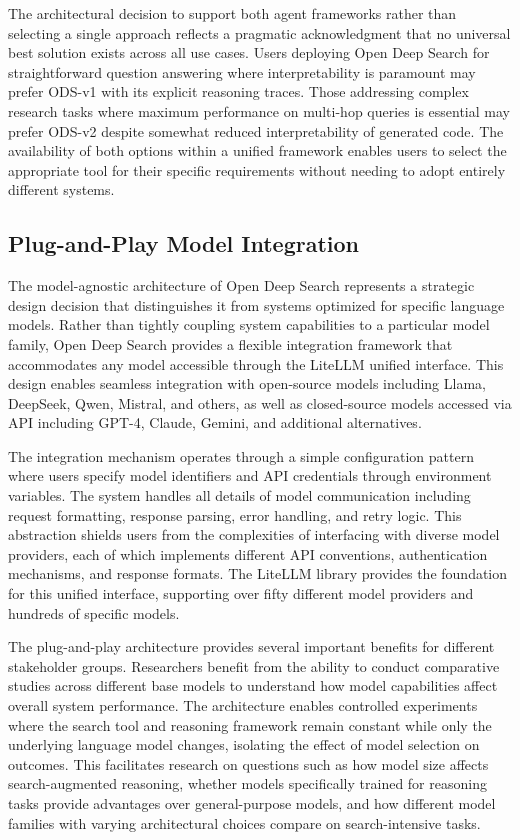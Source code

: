 The architectural decision to support both agent frameworks rather than selecting a single approach reflects a pragmatic acknowledgment that no universal best solution exists across all use cases. Users deploying Open Deep Search for straightforward question answering where interpretability is paramount may prefer ODS-v1 with its explicit reasoning traces. Those addressing complex research tasks where maximum performance on multi-hop queries is essential may prefer ODS-v2 despite somewhat reduced interpretability of generated code. The availability of both options within a unified framework enables users to select the appropriate tool for their specific requirements without needing to adopt entirely different systems.

\subsection{Plug-and-Play Model Integration}

The model-agnostic architecture of Open Deep Search represents a strategic design decision that distinguishes it from systems optimized for specific language models. Rather than tightly coupling system capabilities to a particular model family, Open Deep Search provides a flexible integration framework that accommodates any model accessible through the LiteLLM unified interface. This design enables seamless integration with open-source models including Llama, DeepSeek, Qwen, Mistral, and others, as well as closed-source models accessed via API including GPT-4, Claude, Gemini, and additional alternatives.

The integration mechanism operates through a simple configuration pattern where users specify model identifiers and API credentials through environment variables. The system handles all details of model communication including request formatting, response parsing, error handling, and retry logic. This abstraction shields users from the complexities of interfacing with diverse model providers, each of which implements different API conventions, authentication mechanisms, and response formats. The LiteLLM library provides the foundation for this unified interface, supporting over fifty different model providers and hundreds of specific models.

The plug-and-play architecture provides several important benefits for different stakeholder groups. Researchers benefit from the ability to conduct comparative studies across different base models to understand how model capabilities affect overall system performance. The architecture enables controlled experiments where the search tool and reasoning framework remain constant while only the underlying language model changes, isolating the effect of model selection on outcomes. This facilitates research on questions such as how model size affects search-augmented reasoning, whether models specifically trained for reasoning tasks provide advantages over general-purpose models, and how different model families with varying architectural choices compare on search-intensive tasks.

